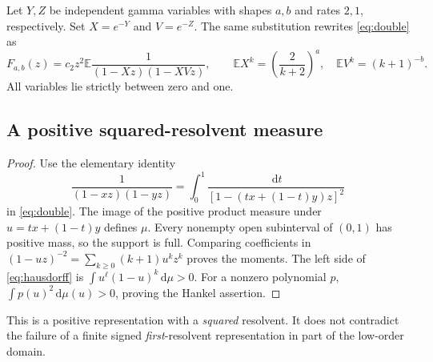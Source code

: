 \documentclass[11pt,letterpaper]{article}
\numberwithin{equation}{section}
\newtheorem{proposition}[theorem]{Proposition}
\theoremstyle{definition}
\theoremstyle{remark}
\newcommand{\E}{\mathbb E}
\newcommand{\dd}{\,\mathrm d}
\begin{document}
Let $Y,Z$ be independent gamma variables with shapes $a,b$ and rates
$2,1$, respectively. Set $X=e^{-Y}$ and $V=e^{-Z}$. The same substitution
rewrites \eqref{eq:double} as
\begin{equation}\label{eq:probability}
 F_{a,b}(z)=c_2z^2\E\frac1{(1-Xz)(1-XVz)},
 \qquad \E X^k=\left(\frac2{k+2}\right)^a,
 \quad \E V^k=(k+1)^{-b}.
\end{equation}
All variables lie strictly between zero and one.

\subsection{A positive squared-resolvent measure}
\begin{proof}
Use the elementary identity
\[
 \frac1{(1-xz)(1-yz)}=
 \int_0^1\frac{\dd t}{[1-(tx+(1-t)y)z]^2}
\]
in \eqref{eq:double}. The image of the positive product measure under
$u=tx+(1-t)y$ defines $\mu$. Every nonempty open subinterval of $(0,1)$
has positive mass, so the support is full. Comparing coefficients in
$(1-uz)^{-2}=\sum_{k\ge0}(k+1)u^kz^k$ proves the moments.
The left side of \eqref{eq:hausdorff} is
$\int u^\ell(1-u)^k\dd\mu>0$. For a nonzero polynomial $p$,
$\int p(u)^2\dd\mu(u)>0$, proving the Hankel assertion.
\end{proof}
This is a positive representation with a \emph{squared} resolvent. It
does not contradict the failure of a finite signed \emph{first}-resolvent
representation in part of the low-order domain.
\end{document}

